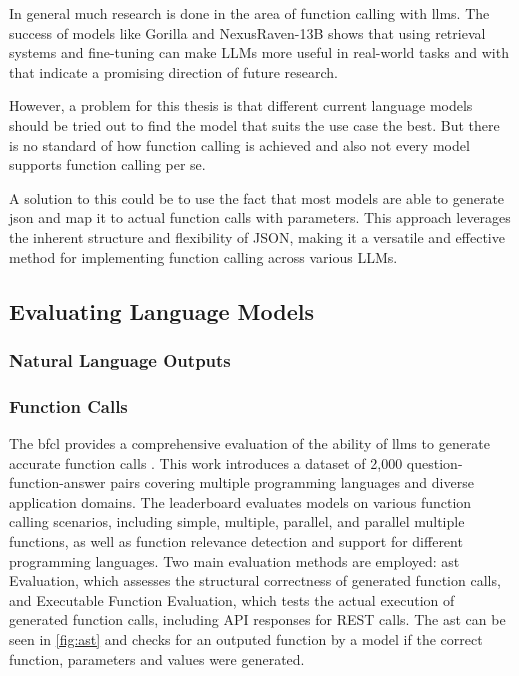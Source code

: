 In general much research is done in the area of function calling with \glspl{llm}.
The success of models like Gorilla and NexusRaven-13B shows that using retrieval systems and fine-tuning can make LLMs more useful in real-world tasks and with that indicate a promising direction of future research.

However, a problem for this thesis is that different current language models should be tried out to find the model that suits the use case the best. But there is no standard of how function calling is achieved and also not every model supports function calling per se.

A solution to this could be to use the fact that most models are able to generate \gls{json} and map it to actual function calls with parameters. This approach leverages the inherent structure and flexibility of JSON, making it a versatile and effective method for implementing function calling across various LLMs.


\subsection{Evaluating Language Models}
\subsubsection{Natural Language Outputs}
\subsubsection{Function Calls}
The \gls{bfcl} provides a comprehensive evaluation of the ability of \glspl{llm} to generate accurate function calls \cite{berkeley-function-calling-leaderboard}. 
This work introduces a dataset of 2,000 question-function-answer pairs covering multiple programming languages and diverse application domains. 
The leaderboard evaluates models on various function calling scenarios, including simple, multiple, parallel, and parallel multiple functions, as well as function relevance detection and support for different programming languages. 
Two main evaluation methods are employed: \gls{ast} Evaluation, which assesses the structural correctness of generated function calls, and Executable Function Evaluation, which tests the actual execution of generated function calls, including API responses for REST calls.
The \gls{ast} can be seen in \cref{fig:ast} and checks for an outputed function by a model if the correct function, parameters and values were generated.

